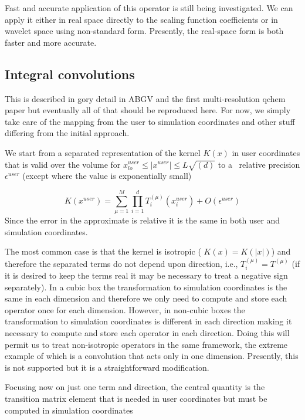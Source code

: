 \documentclass[letterpaper]{article}
\begin{document}
Fast and accurate application of this operator is still being investigated. We can apply it either in real space
directly to the scaling function coefficients or in wavelet space using non-standard form. Presently, the real-space
form is both faster and more accurate.

\subsection{Integral convolutions}
This is described in gory detail in ABGV and the first multi-resolution qchem paper but eventually all of that should be
reproduced here. For now, we simply take care of the mapping from the user to simulation coordinates and other stuff
differing from the initial approach.

We start from a separated representation of the kernel  $K(x)$ in user coordinates that is valid over the volume for 
$x_{\mathit{lo}}^{\mathit{user}}\le |x^{\mathit{user}}|\le L\sqrt{(d)}$ to a \ relative precision  $\epsilon
^{\mathit{user}}$ (except where the value is exponentially small) 

\begin{equation}
K(x^{\mathit{user}})=\sum _{\mu =1}^{M}{\prod _{i=1}^{d}{T_{i}^{(\mu )}(x_{i}^{\mathit{user}})}}+O(\epsilon
^{\mathit{user}})
\end{equation}
Since the error in the approximate is relative it is the same in both user and simulation coordinates.

The most common case is that the kernel is isotropic ( $K(x)=K(|x|)$) and therefore the separated terms do not depend
upon direction, i.e.,  $T_{i}^{(\mu )}=T^{(\mu )}$ (if it is desired to keep the terms real it may be necessary to
treat a negative sign separately). In a cubic box the transformation to simulation coordinates is the same in each
dimension and therefore we only need to compute and store each operator once for each dimension. However, in non-cubic
boxes the transformation to simulation coordinates is different in each direction making it necessary to compute and
store each operator in each direction. Doing this will permit us to treat non-isotropic operators in the same
framework, the extreme example of which is a convolution that acts only in one dimension. Presently, this is not
supported but it is a straightforward modification.

Focusing now on just one term and direction, the central quantity is the transition matrix element that is needed in
user coordinates but must be computed in simulation coordinates 
\end{document}
